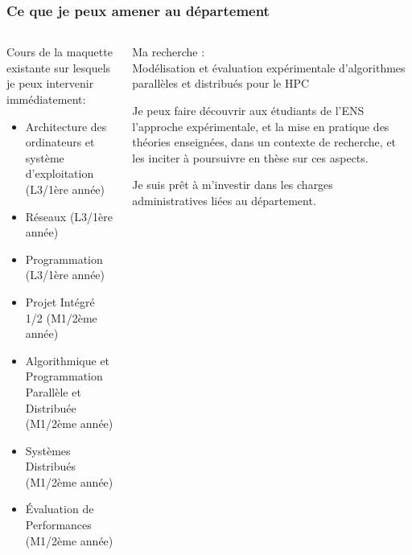 \begin{frame}
  \frametitle{Ce que je peux amener au d\'epartement}

  \begin{columns}
    \begin{column}{.55\linewidth}
      Cours de la maquette existante sur lesquels je peux intervenir imm\'ediatement:
      \begin{itemize}\small
      \item Architecture des ordinateurs et syst\`eme d'exploitation (L3/1\`ere ann\'ee)
      \item R\'eseaux (L3/1\`ere ann\'ee)
      \item Programmation (L3/1\`ere ann\'ee)
      \item Projet Int\'egr\'e 1/2 (M1/2\`eme ann\'ee)
      \item Algorithmique et Programmation Parall\`ele et Distribu\'ee (M1/2\`eme ann\'ee)
      \item Syst\`emes Distribu\'es (M1/2\`eme ann\'ee)
      \item \'Evaluation de Performances (M1/2\`eme ann\'ee)
      \end{itemize}
    \end{column}\begin{column}{.4\linewidth}
      \small
      Ma recherche : \\
      Mod\'elisation et \'evaluation exp\'erimentale d'algorithmes parall\`eles et distribu\'es pour le HPC

      \bigskip
      
      Je peux faire d\'ecouvrir aux \'etudiants de l'ENS l'approche exp\'erimentale, et la mise en pratique des th\'eories enseign\'ees, dans un contexte de recherche, et les inciter \`a poursuivre en th\`ese sur ces aspects.

      \bigskip

      Je suis pr\^et \`a m'investir dans les charges administratives li\'ees au d\'epartement.
      
    \end{column}
  \end{columns}
  
\end{frame}
